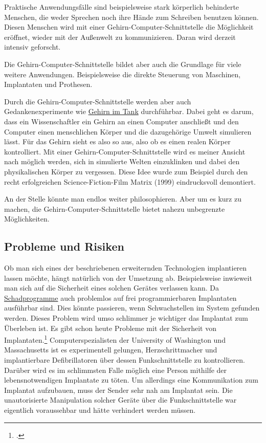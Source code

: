 Praktische Anwendungsfälle sind beispielsweise stark körperlich behinderte Menschen, die weder
Sprechen noch ihre Hände zum Schreiben benutzen können. Diesen Menschen wird mit einer
Gehirn-Computer-Schnittstelle die Möglichkeit eröffnet, wieder mit der Außenwelt zu kommunizieren.
Daran wird derzeit intensiv geforscht.

Die Gehirn-Computer-Schnittstelle bildet aber auch die Grundlage für viele weitere Anwendungen.
Beispielsweise die direkte Steuerung von Maschinen, Implantaten und Prothesen.

Durch die Gehirn-Computer-Schnittstelle werden aber auch Gedankenexperimente wie
\href{http://de.wikipedia.org/wiki/Gehirn_im_Tank}{Gehirn im Tank} durchführbar. Dabei geht es darum,
dass ein Wissenschaftler ein Gehirn an einen Computer anschließt und den Computer einen menschlichen
Körper und die dazugehörige Umwelt simulieren lässt. Für das Gehirn sieht es also so aus, also ob es
einen realen Körper kontrolliert. Mit einer Gehirn-Computer-Schnittstelle wird es meiner Ansicht nach
möglich werden, sich in simulierte Welten einzuklinken und dabei den physikalischen Körper zu
vergessen. Diese Idee wurde zum Beispiel durch den recht erfolgreichen Science-Fiction-Film Matrix
(1999) eindrucksvoll demontiert.

An der Stelle könnte man endlos weiter philosophieren. Aber um es kurz zu machen, die
Gehirn-Computer-Schnittstelle bietet nahezu unbegrenzte Möglichkeiten.

\subsection{Probleme und Risiken}
\label{sec:Robin:future:problems}
Ob man sich eines der beschriebenen erweiternden Technologien implantieren lassen möchte, hängt
natürlich von der Umsetzung ab. Beispielsweise inwieweit man sich auf die Sicherheit eines solchen
Gerätes verlassen kann. Da
\href{http://de.wikipedia.org/wiki/Schadprogramm}{Schadprogramme}
auch problemlos auf frei programmierbaren Implantaten
ausführbar sind. Dies könnte passieren, wenn Schwachstellen im System gefunden werden. Dieses Problem
wird umso schlimmer je wichtiger das Implantat zum Überleben ist. Es gibt schon heute Probleme mit
der Sicherheit von Implantaten.\footcite{Heise:Pacemaker_Hacker, MIT:Protect_implants_from_attack}
Computerspezialisten der University of Washington und Massachusetts ist es experimentell gelungen,
Herzschrittmacher und implantierbare Defibrillatoren über dessen Funkschnittstelle zu kontrollieren.
Darüber wird es im schlimmsten Falle möglich eine Person mithilfe der lebensnotwendigen Implantate zu
töten. Um allerdings eine Kommunikation zum Implantat aufzubauen, muss der Sender sehr nah am
Implantat sein.
Die unautorisierte Manipulation solcher Geräte über die Funkschnittstelle war eigentlich voraussehbar
und hätte verhindert werden müssen.

